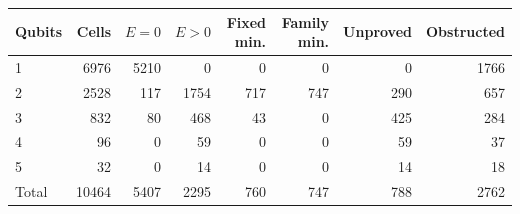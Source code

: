 \begin{center}\small\begin{tabular}{lrrrrrrr}\toprule
Qubits & Cells & $E=0$ & $E>0$ & Fixed min. & Family min. & Unproved & Obstructed\\\midrule
1 & 6976 & 5210 & 0 & 0 & 0 & 0 & 1766\\
2 & 2528 & 117 & 1754 & 717 & 747 & 290 & 657\\
3 & 832 & 80 & 468 & 43 & 0 & 425 & 284\\
4 & 96 & 0 & 59 & 0 & 0 & 59 & 37\\
5 & 32 & 0 & 14 & 0 & 0 & 14 & 18\\
Total & 10464 & 5407 & 2295 & 760 & 747 & 788 & 2762\\
\bottomrule\end{tabular}\end{center}
